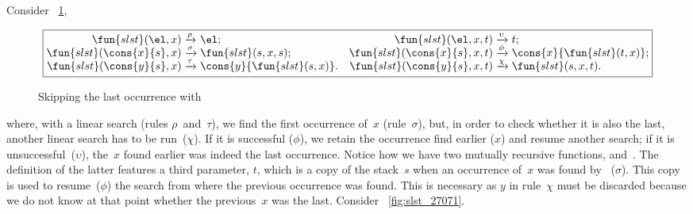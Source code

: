 Consider \fig~\ref{fig:slst},
\begin{figure}[b]
\begin{equation*}
\boxed{%
\begin{array}{@{}r@{\;}l@{\;}lr@{\;}l@{\;}l@{}}
  \fun{slst}(\el,x)           & \xrightarrow{\smash{\rho}} & \el;
& \fun{slst}(\el,x,t)         & \xrightarrow{\smash{\upsilon}} & t;\\
  \fun{slst}(\cons{x}{s},x)   & \xrightarrow{\smash{\sigma}} &
                                           \fun{slst}(s,x,s);
& \fun{slst}(\cons{x}{s},x,t) & \xrightarrow{\smash{\phi}} &
                                           \cons{x}{\fun{slst}(t,x)};\\
  \fun{slst}(\cons{y}{s},x)   & \xrightarrow{\smash{\tau}} &
                                           \cons{y}{\fun{slst}(s,x)}.
& \fun{slst}(\cons{y}{s},x,t) & \xrightarrow{\smash{\chi}} &
                                           \fun{slst}(s,x,t).
\end{array}}
\end{equation*}
\caption{Skipping the last occurrence with }
\label{fig:slst}
\end{figure}
where, with a linear search (rules
\(\rho\)~and~\(\tau\)), we find the first occurrence of~\(x\)
(rule~\(\sigma\)), but, in order to check whether it is also the last,
another linear search has to be run~(\(\chi\)). If it is successful
(\(\phi\)), we retain the occurrence find earlier (\(x\)) and resume
another search; if it is unsuccessful~(\(\upsilon\)), the~\(x\) found
earlier was indeed the last occurrence.  Notice how we have two
mutually recursive functions, 
and~. The definition of the
latter features a third parameter, \(t\), which is a copy of the
stack~\(s\) when an occurrence of~\(x\) was found
by~ (\(\sigma\)). This copy is
used to resume~(\(\phi\)) the search from where the previous
occurrence was found. This is necessary as \(y\) in rule~\(\chi\) must
be discarded because we do not know at that point whether the
previous~\(x\) was the last. Consider \fig~\vref{fig:slst_27071}.
